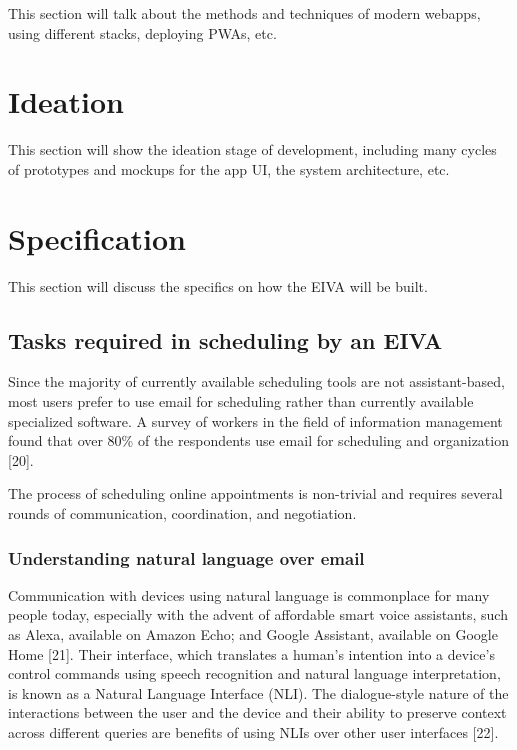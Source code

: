\documentclass{article}
\begin{document}
This section will talk about the methods and techniques of modern webapps, using different stacks, deploying PWAs, etc.

\newpage

\section{Ideation}

This section will show the ideation stage of development, including many cycles of prototypes and mockups for the app UI, the system architecture, etc.

\newpage

\section{Specification}

This section will discuss the specifics on how the EIVA will be built.

\subsection{Tasks required in scheduling by an EIVA}

Since the majority of currently available scheduling tools are not assistant-based, most users prefer to use email for scheduling rather than currently available specialized software. A survey of workers in the field of information management found that over 80\% of the respondents use email for scheduling and organization [20].

The process of scheduling online appointments is non-trivial and requires several rounds of communication, coordination, and negotiation.

\subsubsection{Understanding natural language over email}

Communication with devices using natural language is commonplace for many people today, especially with the advent of affordable smart voice assistants, such as Alexa, available on Amazon Echo; and Google Assistant, available on Google Home [21]. Their interface, which translates a human’s intention into a device’s control commands using speech recognition and natural language interpretation, is known as a Natural Language Interface (NLI). The dialogue-style nature of the interactions between the user and the device and their ability to preserve context across different queries are benefits of using NLIs over other user interfaces [22].
\end{document}
